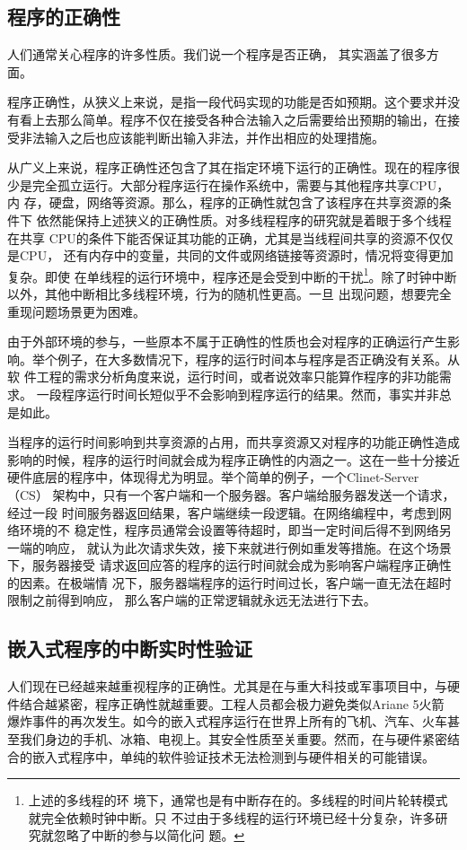 \subsection{程序的正确性}
\label{subsec:correctness}
人们通常关心程序的许多性质。我们说一个程序是否正确，\cite{Harel198061}
其实涵盖了很多方面。

程序正确性，从狭义上来说，是指一段代码实现的功能是否如预期。这个要求并没
有看上去那么简单。程序不仅在接受各种合法输入之后需要给出预期的输出，在接
受非法输入之后也应该能判断出输入非法，并作出相应的处理措施。

从广义上来说，程序正确性还包含了其在指定环境下运行的正确性。现在的程序很
少是完全孤立运行。大部分程序运行在操作系统中，需要与其他程序共享CPU，内
存，硬盘，网络等资源。那么，程序的正确性就包含了该程序在共享资源的条件下
依然能保持上述狭义的正确性质。对多线程程序的研究就是着眼于多个线程在共享
CPU的条件下能否保证其功能的正确，尤其是当线程间共享的资源不仅仅是CPU，
还有内存中的变量，共同的文件或网络链接等资源时，情况将变得更加复杂。即使
在单线程的运行环境中，程序还是会受到中断的干扰\footnote{上述的多线程的环
境下，通常也是有中断存在的。多线程的时间片轮转模式就完全依赖时钟中断。只
不过由于多线程的运行环境已经十分复杂，许多研究就忽略了中断的参与以简化问
题。}。除了时钟中断以外，其他中断相比多线程环境，行为的随机性更高。一旦
出现问题，想要完全重现问题场景更为困难。

由于外部环境的参与，一些原本不属于正确性的性质也会对程序的正确运行产生影
响。举个例子，在大多数情况下，程序的运行时间本与程序是否正确没有关系。从软
件工程的需求分析角度来说，运行时间，或者说效率只能算作程序的非功能需求。
一段程序运行时间长短似乎不会影响到程序运行的结果。然而，事实并非总是如此。

当程序的运行时间影响到共享资源的占用，而共享资源又对程序的功能正确性造成
影响的时候，程序的运行时间就会成为程序正确性的内涵之一。这在一些十分接近
硬件底层的程序中，体现得尤为明显。举个简单的例子，一个Clinet-Server（CS）
架构中，只有一个客户端和一个服务器。客户端给服务器发送一个请求，经过一段
时间服务器返回结果，客户端继续一段逻辑。在网络编程中，考虑到网络环境的不
稳定性，程序员通常会设置等待超时，即当一定时间后得不到网络另一端的响应，
就认为此次请求失效，接下来就进行例如重发等措施。在这个场景下，服务器接受
请求返回应答的程序的运行时间就会成为影响客户端程序正确性的因素。在极端情
况下，服务器端程序的运行时间过长，客户端一直无法在超时限制之前得到响应，
那么客户端的正常逻辑就永远无法进行下去。

\subsection{嵌入式程序的中断实时性验证}
\label{subsec:embedded_intr}
人们现在已经越来越重视程序的正确性。尤其是在与重大科技或军事项目中，与硬
件结合越紧密，程序正确性就越重要。工程人员都会极力避免类似Ariane 5火箭
爆炸事件\cite{www.around.com}的再次发生。如今的嵌入式程序运行在世界上所有的飞机、汽车、火车甚
至我们身边的手机、冰箱、电视上。其安全性质至关重要。然而，在与硬件紧密结
合的嵌入式程序中，单纯的软件验证技术无法检测到与硬件相关的可能错误。

